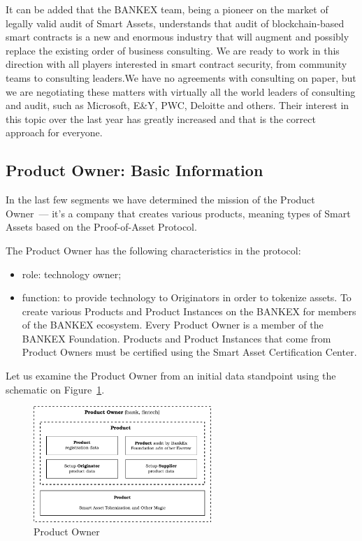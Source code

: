 \documentclass{article}
\begin{document}
\begin{multicols}{2}
It can be added that the BANKEX team, being a pioneer on the market of legally valid audit of Smart Assets, understands that audit of blockchain-based smart contracts is a new and enormous industry that will augment and possibly replace the existing order of business consulting. We are ready to work in this direction with all players interested in smart contract security, from community teams to consulting leaders.We have no agreements with consulting on paper, but we are negotiating these matters with virtually all the world leaders of consulting and audit, such as Microsoft, E\&Y, PWC, Deloitte and others. Their interest in this topic over the last year has greatly increased and that is the correct approach for everyone.

\subsection{Product Owner: Basic Information}

In the last few segments we have determined the mission of the Product Owner~--- it’s a company that creates various products, meaning types of Smart Assets based on the Proof-of-Asset Protocol.

The Product Owner has the following characteristics in the protocol:

\begin{itemize}
\item role: technology owner;
\item function: to provide technology to Originators in order to tokenize assets. To create various Products and Product Instances on the BANKEX for members of the BANKEX ecosystem. Every Product Owner is a member of the BANKEX Foundation. Products and Product Instances that come from Product Owners must be  certified using the Smart Asset Certification Center.
\end{itemize}

Let us examine the Product Owner from an initial data standpoint using the schematic on Figure~\ref{fig:product-owner}.

\begin{figure}
  \centering
  \includegraphics[width=0.6\textwidth]{product-owner.pdf}
  \caption{Product Owner}
  \label{fig:product-owner}
\end{figure}


\end{multicols}
\end{document}
